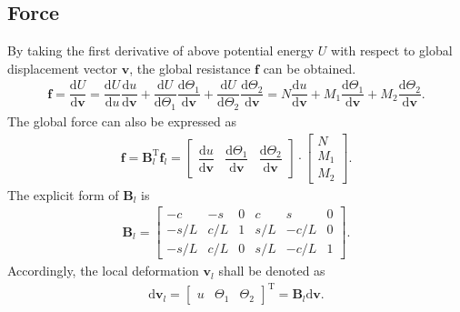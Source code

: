 \documentclass[11pt]{article}
\begin{document}
\subsection{Force}
By taking the first derivative of above potential energy $U$ with respect to global displacement vector $\mathbf{v}$, the global resistance $\mathbf{f}$ can be obtained.
\begin{gather}
\mathbf{f}=\dfrac{\mathrm{d}U}{\mathrm{d}\mathbf{v}}=\dfrac{\mathrm{d}U}{\mathrm{d}u}\dfrac{\mathrm{d}u}{\mathrm{d}\mathbf{v}}+\dfrac{\mathrm{d}U}{\mathrm{d}\Theta_1}\dfrac{\mathrm{d}\Theta_1}{\mathrm{d}\mathbf{v}}+\dfrac{\mathrm{d}U}{\mathrm{d}\Theta_2}\dfrac{\mathrm{d}\Theta_2}{\mathrm{d}\mathbf{v}}=N\dfrac{\mathrm{d}u}{\mathrm{d}\mathbf{v}}+M_1\dfrac{\mathrm{d}\Theta_1}{\mathrm{d}\mathbf{v}}+M_2\dfrac{\mathrm{d}\Theta_2}{\mathrm{d}\mathbf{v}}.
\end{gather}
The global force can also be expressed as
\begin{gather}
\mathbf{f}=\mathbf{B}_l^\mathrm{T}\mathbf{f}_l=\begin{bmatrix}
\dfrac{\mathrm{d}u}{\mathrm{d}\mathbf{v}}&\dfrac{\mathrm{d}\Theta_1}{\mathrm{d}\mathbf{v}}&\dfrac{\mathrm{d}\Theta_2}{\mathrm{d}\mathbf{v}}
\end{bmatrix}\cdot\begin{bmatrix}
N\\M_1\\M_2
\end{bmatrix}.
\end{gather}
The explicit form of $\mathbf{B}_l$ is
\begin{gather}
\mathbf{B}_l=
\begin{bmatrix}
	-c   & -s  & 0 & c   & s    & 0 \\
	-s/L & c/L & 1 & s/L & -c/L & 0 \\
	-s/L & c/L & 0 & s/L & -c/L & 1
\end{bmatrix}.
\end{gather}
Accordingly, the local deformation $\mathbf{v}_l$ shall be denoted as
\begin{gather}
\mathrm{d}\mathbf{v}_l=\begin{bmatrix}
u&\Theta_1&\Theta_2
\end{bmatrix}^\mathrm{T}=\mathbf{B}_l\mathrm{d}\mathbf{v}.
\end{gather}
\end{document}
